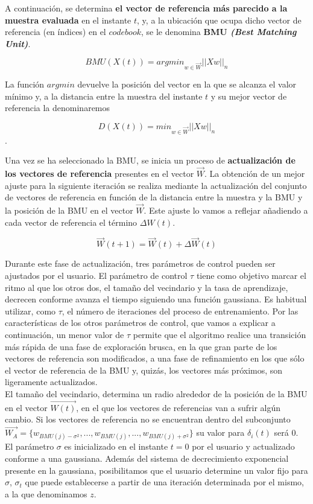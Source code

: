 A continuación, se determina \textbf{el vector de referencia más parecido a la muestra evaluada} en el instante $t$, y, a la ubicación que ocupa dicho vector de referencia (en índices) en el $codebook$, se le denomina \textbf{BMU \textit{(Best Matching Unit)}}.

$$ BMU(X(t)) = argmin_{w \in \vec{W}}{||Xw||}_n$$

La función $argmin$ devuelve la posición del vector en la que se alcanza el valor mínimo y, a la distancia entre la muestra del instante $t$ y su mejor vector de referencia la denominaremos

$$ D(X(t)) = min_{w \in \vec{W}}{||Xw||}_n$$. 

Una vez se ha seleccionado la BMU, se inicia un proceso de \textbf{actualización de los vectores de referencia} presentes en el vector $\vec{W}$. La obtención de un mejor ajuste para la siguiente iteración se realiza mediante la actualización del conjunto de vectores de referencia en función de la distancia entre la muestra y la BMU y la posición de la BMU en el vector $\vec{W}$. Este ajuste lo vamos a reflejar añadiendo a cada vector de referencia el término $\Delta W(t)$.

$$\vec{W}(t+1) = \vec{W}(t) + \Delta \vec{W}(t)$$

Durante este fase de actualización, tres parámetros de control pueden ser ajustados por el usuario. El parámetro de control $\tau$ tiene como objetivo marcar el ritmo al que los otros dos, el tamaño del vecindario y la tasa de aprendizaje, decrecen conforme avanza el tiempo siguiendo una función gaussiana. Es habitual utilizar, como $\tau$, el número de iteraciones del proceso de entrenamiento. Por las características de los otros parámetros de control, que vamos a explicar a continuación, un menor valor de $\tau$ permite que el algoritmo realice una transición más rápida de una fase de exploración brusca, en la que gran parte de los vectores de referencia son modificados, a una fase de refinamiento en los que sólo el vector de referencia de la BMU y, quizás, los vectores más próximos, son ligeramente actualizados.\\

El tamaño del vecindario, determina un radio alrededor de la posición de la BMU en el vector $\vec{W(t)}$, en el que los vectores de referencias van a sufrir algún cambio. Si los vectores de referencia no se encuentran dentro del subconjunto $\vec{W_A} = \{w_{BMU(j)-\sigma^2}, ..., w_{BMU(j)}, ..., w_{BMU(j)+ \sigma^2} \}$ su valor para $\delta_i(t)$ será 0. El parámetro $\sigma$ es inicializado en el instante $t=0$ por el usuario y actualizado conforme a una gaussiana. Además del sistema de decrecimiento exponencial presente en la gaussiana, posibilitamos que el usuario determine un valor fijo para $\sigma$, $\sigma_t$ que puede establecerse a partir de una iteración determinada por el mismo, a la que denominamos $z$.



